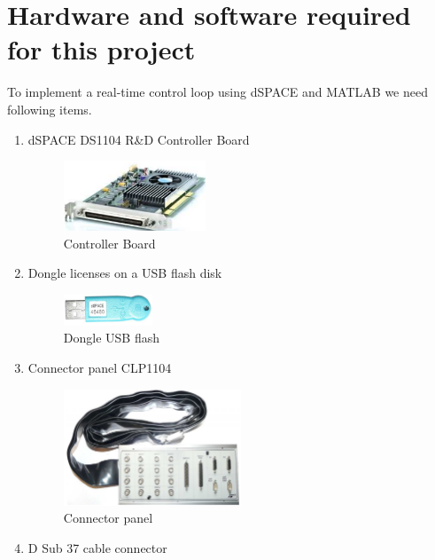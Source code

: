 \section{Hardware and software required for this project}

To implement a real-time control loop using dSPACE and MATLAB we need following items.

\begin{enumerate}
    \item dSPACE DS1104 R\&D Controller Board
        \begin{figure}[H]
            \centering
            \includegraphics[width=0.4\textwidth]{Images/Ball and Bean/DS1104.png}
            \caption{Controller Board}
            \label{fig1}
        \end{figure}
    \item Dongle licenses on a USB flash disk
        \begin{figure}[H]
            \centering
            \includegraphics[width=0.25\textwidth]{Images/Ball and Bean/Dongle.png}
            \caption{Dongle USB flash}
            \label{fig2}
        \end{figure}
    \item Connector panel CLP1104
        \begin{figure}[H]
            \centering
            \includegraphics[width=0.5\textwidth]{Images/Ball and Bean/CLP1104.png}
            \caption{Connector panel}
            \label{fig3}
        \end{figure}
    \item D Sub 37 cable connector
        \begin{figure}[H]

\end{figure}
\end{enumerate}
